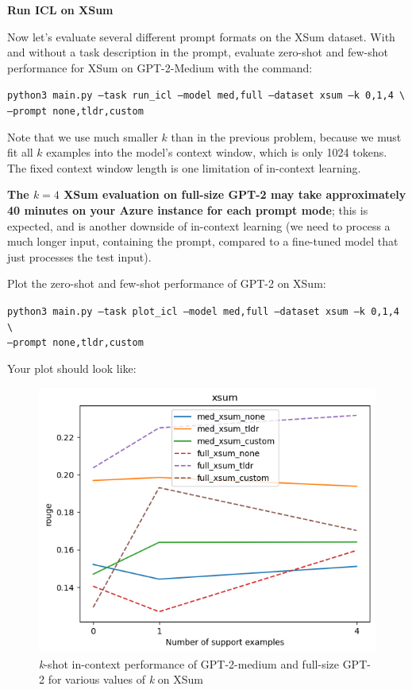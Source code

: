 \item {} {\bf Run ICL on XSum}

Now let's evaluate several different prompt formats on the XSum dataset. With and without a task description in the prompt, evaluate zero-shot and few-shot performance for XSum on GPT-2-Medium with the command:

\texttt{\small python3 main.py --task run\_icl --model med,full --dataset xsum --k 0,1,4 \textbackslash \\
\phantom{asdf}--prompt none,tldr,custom}

Note that we use much smaller $k$ than in the previous problem, because we must fit all $k$ examples into the model's context window, which is only 1024 tokens. The fixed context window length is one limitation of in-context learning.

\textbf{The $k=4$ XSum evaluation on full-size GPT-2 may take approximately 40 minutes on your Azure instance for each prompt mode}; this is expected, and is another downside of in-context learning (we need to process a much longer input, containing the prompt, compared to a fine-tuned model that just processes the test input).

Plot the zero-shot and few-shot performance of GPT-2 on XSum:

\texttt{\small python3 main.py --task plot\_icl --model med,full --dataset xsum --k 0,1,4 \textbackslash \\
\phantom{asdf}--prompt none,tldr,custom}

Your plot should look like:
\begin{figure}[H]
    \centering
    \includegraphics[width=0.75\linewidth]{./figures/q2_xsum_plot}
    \caption{\textit{k}-shot in-context performance of GPT-2-medium and full-size GPT-2 for various values of \textit{k} on XSum}
\end{figure}


